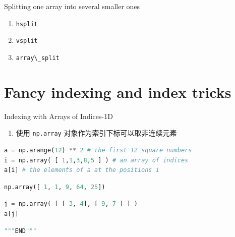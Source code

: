 \documentclass[ignorenonframetext,11pt,xcolor=dvipsnames,hyperref={colorlinks,allcolors=.,urlcolor=blue, citecolor=violet, bookmarksdepth=4},aspectratio=1610]{beamer}
\providecommand{\tightlist}{%
  \setlength{\itemsep}{0pt}\setlength{\parskip}{0pt}}
\newcommand{\passthrough}[1]{#1}
\begin{document}
\begin{frame}[fragile]{Splitting one array into several smaller ones}
\protect\hypertarget{splitting-one-array-into-several-smaller-ones}{}

\begin{enumerate}
\tightlist
\item
  \passthrough{\lstinline!hsplit!}
\item
  \passthrough{\lstinline!vsplit!}
\item
  \passthrough{\lstinline!array\_split!}
\end{enumerate}

\end{frame}

\hypertarget{fancy-indexing-and-index-tricks}{%
\section{Fancy indexing and index
tricks}\label{fancy-indexing-and-index-tricks}}

\begin{frame}[fragile]{Indexing with Arrays of Indices-1D}
\protect\hypertarget{indexing-with-arrays-of-indices-1d}{}

\begin{enumerate}
\tightlist
\item
  使用 \passthrough{\lstinline!np.array!}
  对象作为索引下标可以取非连续元素
\end{enumerate}

\begin{lstlisting}[language=Python]
a = np.arange(12) ** 2 # the first 12 square numbers
i = np.array( [ 1,1,3,8,5 ] ) # an array of indices
a[i] # the elements of a at the positions i
\end{lstlisting}

\begin{lstlisting}[language=Python]
np.array([ 1, 1, 9, 64, 25])
\end{lstlisting}

\begin{lstlisting}[language=Python]
j = np.array( [ [ 3, 4], [ 9, 7 ] ] )
a[j]
\end{lstlisting}

\begin{lstlisting}[language=Python]
"""END"""
\end{lstlisting}

\end{frame}
\end{document}
